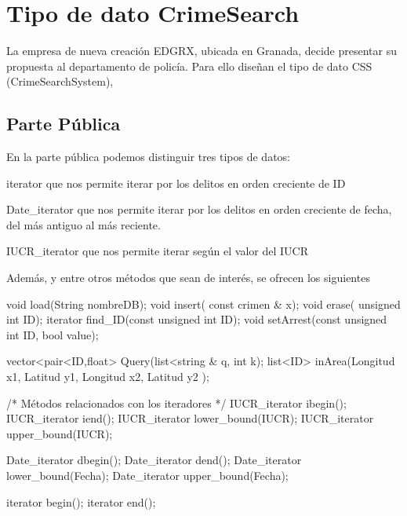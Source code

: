 \hypertarget{index_TDA}{}\section{Tipo de dato Crime\+Search}\label{index_TDA}
La empresa de nueva creación E\+D\+G\+R\+X, ubicada en Granada, decide presentar su propuesta al departamento de policía. Para ello diseñan el tipo de dato C\+S\+S (Crime\+Search\+System),\hypertarget{index_publico}{}\subsection{Parte Pública}\label{index_publico}
En la parte pública podemos distinguir tres tipos de datos\+:

\begin{DoxyItemize}
\item iterator que nos permite iterar por los delitos en orden creciente de I\+D \item Date\+\_\+iterator que nos permite iterar por los delitos en orden creciente de fecha, del más antiguo al más reciente. \item I\+U\+C\+R\+\_\+iterator que nos permite iterar según el valor del I\+U\+C\+R\end{DoxyItemize}
Además, y entre otros métodos que sean de interés, se ofrecen los siguientes


\begin{DoxyCode}
\textcolor{keywordtype}{void} load(String nombreDB);
\textcolor{keywordtype}{void} insert( \textcolor{keyword}{const} crimen & x);
\textcolor{keywordtype}{void} erase( \textcolor{keywordtype}{unsigned} \textcolor{keywordtype}{int} ID);
iterator find\_ID(\textcolor{keyword}{const} \textcolor{keywordtype}{unsigned} \textcolor{keywordtype}{int} ID);
\textcolor{keywordtype}{void} setArrest(\textcolor{keyword}{const} \textcolor{keywordtype}{unsigned} \textcolor{keywordtype}{int} ID, \textcolor{keywordtype}{bool} value);

vector<pair<ID,float> Query(list<\textcolor{keywordtype}{string} & q, \textcolor{keywordtype}{int} k);    
list<ID> inArea(Longitud x1, Latitud y1, Longitud x2, Latitud y2 );

\textcolor{comment}{/* Métodos relacionados con los iteradores */}
IUCR\_iterator ibegin();
IUCR\_iterator iend();
IUCR\_iterator lower\_bound(IUCR);
IUCR\_iterator upper\_bound(IUCR);

Date\_iterator dbegin();
Date\_iterator dend();
Date\_iterator lower\_bound(Fecha);
Date\_iterator upper\_bound(Fecha);

iterator begin();
iterator end();
\end{DoxyCode}


